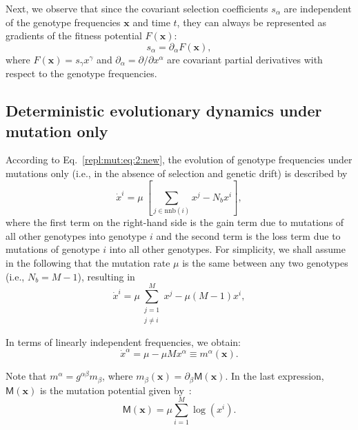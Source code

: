 \documentclass[9pt,twocolumn,twoside]{gsajnl}
\begin{document}
Next, we observe that since the covariant selection coefficients $s_\alpha$ are independent of the genotype frequencies $\mathbf{x}$ and time $t$,
they can always be represented as gradients of the fitness potential $F(\mathbf{x})$:
\begin{equation} \label{F:pot:1}
s_\alpha = \partial_\alpha F(\mathbf{x}),
\end{equation}
where $F(\mathbf{x}) = s_\gamma x^\gamma$ and $\partial_\alpha = {\partial}/{\partial x^\alpha}$ are covariant partial derivatives with respect to the genotype frequencies.

\subsection{Deterministic evolutionary dynamics under mutation only}

According to Eq.~\eqref{repl:mut:eq:2:new}, the evolution of genotype frequencies under mutations only (i.e., in the absence of selection and genetic drift) is described by
\begin{equation} \label{repl:mut:eq:0}
\dot{x}^i = \mu~[ \!\!\!\sum_{j \in \text{nnb} (i)} x^j - N_b x^i ],
\end{equation}
where the first term on the right-hand side is the gain term due to mutations of all other genotypes into genotype $i$ and the second term is the loss term due to mutations of genotype $i$ into all other genotypes.
For simplicity, we shall assume in the following that the mutation rate $\mu$ is the same between any two genotypes (i.e., $N_b = M-1$), resulting in
\begin{equation} \label{mut:eq:1}
\dot{x}^i = \mu \sum_{\substack{j=1 \\ j \ne i}}^M x^j - \mu (M-1) x^i,
\end{equation}

In terms of linearly independent frequencies, we obtain:
\begin{equation} \label{mut:eq:2}
\dot{x}^\alpha = \mu - \mu M x^\alpha \equiv m^\alpha (\mathbf{x}).
\end{equation}

Note that $m^\alpha = g^{\alpha \beta} m_\beta$, where $m_\beta (\mathbf{x}) = \partial_\beta \mathsf{M} (\mathbf{x})$. In the last expression, %
$\mathsf{M} (\mathbf{x})$ is the mutation potential given by~\citep{Baxter2007,Mustonen2010}:
\begin{equation} \label{mut:pot}
\mathsf{M} (\mathbf{x}) = \mu \sum_{i=1}^M \log(x^i).
\end{equation}
\end{document}
